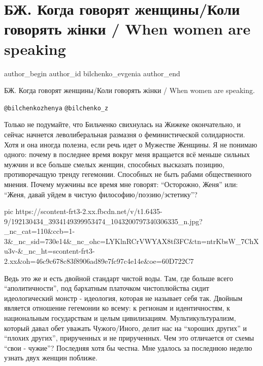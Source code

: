  
 
 
 
 
 
\section{БЖ. Когда говорят женщины/Коли говорять жінки / When women are speaking}
\label{sec:29_05_2021.fb.bilchenko_evgenia.1.when_womena_are_speaking}
\ifcmt
 author_begin
   author_id bilchenko_evgenia
 author_end
\fi

БЖ. Когда говорят женщины/Коли говорять жінки / When women are speaking.

\verb|@bilchenkozhenya|
\verb|@bilchenko_z|

Только не подумайте, что Бильченко свихнулась на Жижеке окончательно, и сейчас
начнется леволиберальная размазня о феминистической солидарности. Хотя и она
иногда полезна, если речь идет о Мужестве Женщины. Я не понимаю одного: почему
в последнее время вокруг меня вращается всё меньше сильных мужчин и все больше
смелых женщин, способных высказать позицию, противоречащую тренду гегемонии.
Способных не быть рабами общественного мнения. Почему мужчины все время мне
говорят: \enquote{Осторожно, Женя} или: \enquote{Женя, давай уйдем в чистую
философию/поэзию/эстетику}?

\ifcmt
  pic https://scontent-frt3-2.xx.fbcdn.net/v/t1.6435-9/192130434_3934149399953474_1043200797340306335_n.jpg?_nc_cat=110&ccb=1-3&_nc_sid=730e14&_nc_ohc=LYKlnRCrVWYAX8tf3FC&tn=ntrKbsW_7ChXu3v-&_nc_ht=scontent-frt3-2.xx&oh=46c9c678c83f8906ad89e7fc97c4e14e&oe=60D722C7
\fi

Ведь это же и есть двойной стандарт чистой воды. Там, где больше всего
\enquote{аполитичности}, под бархатным платочком чистоплюйства сидит идеологический
монстр - идеология, которая не называет себя так. Двойным является отношение
гегемонии ко всему: к регионам и идентичностям, к национальным государствам и
целым цивилизациям. Мультикультурализм, который давал обет уважать
Чужого/Иного, делит нас на \enquote{хороших других} и \enquote{плохих других}, прирученных и не
прирученных. Чем это отличается от схемы \enquote{свои - чужие}? Последняя хотя бы
честна. Мне удалось за последнюю неделю узнать двух женщин поближе.

